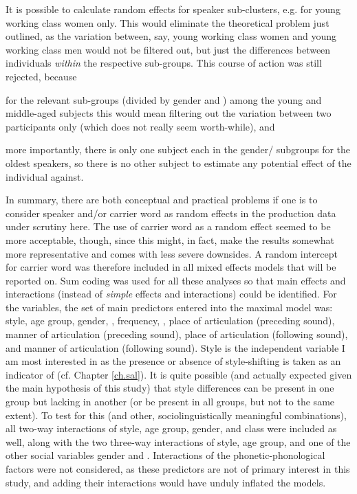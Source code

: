 It is possible to calculate random effects for speaker sub-clusters, e.g. for young working class women only.
This would eliminate the theoretical problem just outlined, as the variation between, say, young working class women and young working class men would not be filtered out, but just the differences between individuals \emph{within} the respective sub-groups.
This course of action was still rejected, because
	\begin{inparaenum}[(a)]
		\item for the relevant sub-groups (divided by gender and ) among the young and middle-aged subjects this would mean filtering out the variation between two participants only (which does not really seem worth-while), and
		\item more importantly, there is only one subject each in the gender/ subgroups for the oldest speakers, so there is no other subject to estimate any potential effect of the individual against.		
	\end{inparaenum}

In summary, there are both conceptual and practical problems if one is to consider speaker and/or carrier word as random effects in the production data under scrutiny here.
The use of carrier word as a random effect seemed to be more acceptable, though, since this might, in fact, make the results somewhat more representative and comes with less severe downsides.
A random intercept for carrier word was therefore included in all mixed effects models that will be reported on.
Sum coding was used for all these analyses so that main effects and interactions (instead of \emph{simple} effects and interactions) could be identified.
For the  variables, the set of main predictors entered into the maximal model was: style, age group, gender, , frequency, , place of articulation (preceding sound), manner of articulation (preceding sound), place of articulation (following sound), and manner of articulation (following sound).
Style is the independent variable I am most interested in as the presence or absence of style-shifting is taken as an indicator of  (cf. Chapter \ref{ch.sal}).
It is quite possible (and actually expected given the main hypothesis of this study) that style differences can be present in one group but lacking in another (or be present in all groups, but not to the same extent).
To test for this (and other, sociolinguistically meaningful combinations), all two-way interactions of style, age group, gender, and class were included as well, along with the two three-way interactions of style, age group, and one of the other social variables gender and .
Interactions of the phonetic-phonological factors were not considered, as these predictors are not of primary interest in this study, and adding their interactions would have unduly inflated the models.

